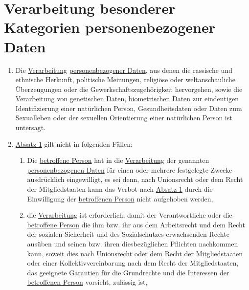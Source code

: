 \chapter{Verarbeitung besonderer Kategorien personenbezogener Daten}
\label{ch:9}


\begin{enumerate}

  \item Die \hyperref[itm:04-2]{Verarbeitung} \hyperref[itm:04-1]{personenbezogener Daten}, aus denen die rassische und ethnische Herkunft, politische Meinungen,
   religiöse oder weltanschauliche Überzeugungen oder die Gewerkschaftszugehörigkeit hervorgehen, sowie die
   \hyperref[itm:04-2]{Verarbeitung} von \hyperref[itm:04-13]{genetischen Daten}, \hyperref[itm:04-14]{biometrischen Daten} zur eindeutigen Identifizierung einer natürlichen Person,
   Gesundheitsdaten oder Daten zum Sexualleben oder der sexuellen Orientierung einer natürlichen Person ist untersagt.
  \label{itm:09-1}

  \item \hyperref[itm:09-1]{Absatz 1} gilt nicht in folgenden Fällen:
  \label{itm:09-2}

  \begin{enumerate}
  
    \item Die \hyperref[itm:04-1]{betroffene Person} hat in die \hyperref[itm:04-2]{Verarbeitung} der genannten \hyperref[itm:04-1]{personenbezogenen Daten} für einen oder mehrere
     festgelegte Zwecke ausdrücklich eingewilligt, es sei denn, nach Unionsrecht oder dem Recht der Mitgliedstaaten
     kann das Verbot nach \hyperref[itm:09-1]{Absatz 1} durch die Einwilligung der \hyperref[itm:04-1]{betroffenen Person} nicht aufgehoben
     werden,
    \label{itm:09-2a}

    \item die \hyperref[itm:04-2]{Verarbeitung} ist erforderlich, damit der Verantwortliche oder die \hyperref[itm:04-1]{betroffene Person} die ihm bzw. ihr aus
     dem Arbeitsrecht und dem Recht der sozialen Sicherheit und des Sozialschutzes erwachsenden Rechte ausüben und
     seinen bzw. ihren diesbezüglichen Pflichten nachkommen kann, soweit dies nach Unionsrecht oder dem Recht der
     Mitgliedstaaten oder einer Kollektivvereinbarung nach dem Recht der Mitgliedstaaten, das geeignete Garantien für
     die Grundrechte und die Interessen der \hyperref[itm:04-1]{betroffenen Person} vorsieht, zulässig ist,
    \label{itm:09-2b}


\end{enumerate}
\end{enumerate}
